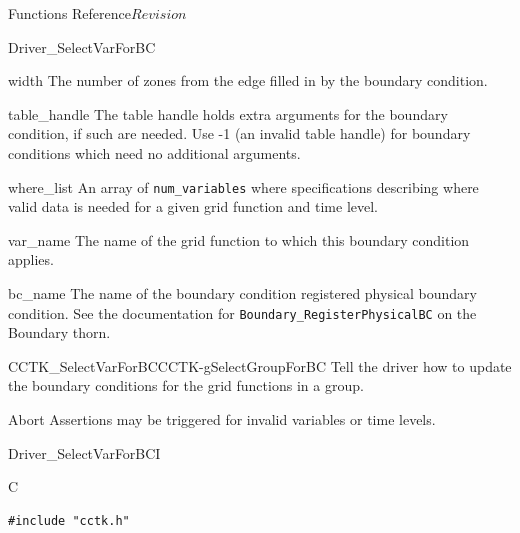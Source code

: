 \begin{cactuspart}{ Functions Reference}{}{$Revision$}
\begin{FunctionDescription}{Driver\_SelectVarForBC}
\begin{ParameterSection}
\begin{Parameter}{width}
The number of zones from the edge filled in by the boundary condition.
\end{Parameter}

\begin{Parameter}{table\_handle}
The table handle holds extra arguments for the boundary condition, if such are needed. Use
-1 (an invalid table handle) for boundary conditions which need no additional arguments.
\end{Parameter}

\begin{Parameter}{where\_list}
An array of \texttt{num\_variables} where specifications describing
where valid data is needed for a given grid function and time level.
\end{Parameter}

\begin{Parameter}{var\_name}
The name of the grid function to which this boundary condition applies.
\end{Parameter}

\begin{Parameter}{bc\_name}
The name of the boundary condition registered physical boundary condition.
See the documentation for \texttt{Boundary\_RegisterPhysicalBC} on the
Boundary thorn.
\end{Parameter}
\end{ParameterSection}

\begin{SeeAlsoSection}
\begin{SeeAlso2}{CCTK\_SelectVarForBC}{CCTK-gSelectGroupForBC}
Tell the driver how to update the boundary conditions for the grid functions in a group.
\end{SeeAlso2}
\end{SeeAlsoSection}

\begin{ErrorSection}
\begin{Error}{Abort}
Assertions may be triggered for invalid variables or time levels.
\end{Error}
\end{ErrorSection}
\end{FunctionDescription}

\begin{FunctionDescription}{Driver\_SelectVarForBCI}
\label{Driver-SelectVarForBCI}
\begin{SynopsisSection}
\begin{Synopsis}{C}
\begin{verbatim}
#include "cctk.h"


\end{verbatim}
\end{Synopsis}
\end{SynopsisSection}
\end{FunctionDescription}
\end{cactuspart}
